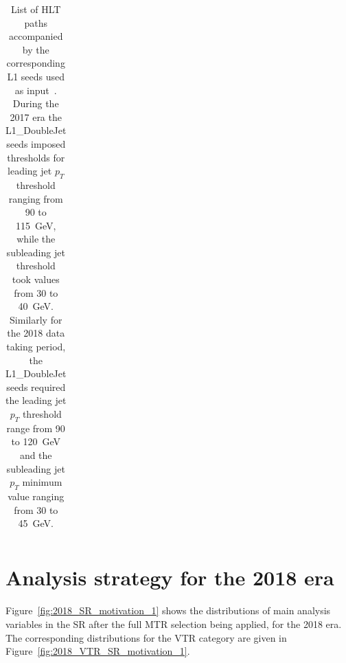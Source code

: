 \begin{table}[htbp]
\begin{tabular}{l l c}
        \hline\hline %
    \end{tabular}
    \caption{List of HLT paths accompanied by the corresponding L1 seeds used as input~\cite{note:AN_19_257}.
    During the 2017 era the L1\_DoubleJet seeds imposed thresholds for leading jet $p_T$ threshold ranging from 90 to 115~GeV, while the subleading jet threshold took values from 30 to 40~GeV.
    Similarly for the 2018 data taking period, the L1\_DoubleJet seeds required the leading jet $p_T$ threshold range from 90 to 120~GeV and the subleading jet $p_T$ minimum value ranging from 30 to 45~GeV.}
    \label{a_tab:triggers}

\end{table}

\newpage
\section{Analysis strategy for the 2018 era}
\label{app:MTR_2018}
\hspace{10pt} Figure~\ref{fig:2018_SR_motivation_1} shows the distributions of main analysis variables in the SR after the full MTR selection being applied, for the 2018 era. The corresponding distributions for the VTR category are given in Figure~\ref{fig:2018_VTR_SR_motivation_1}.

